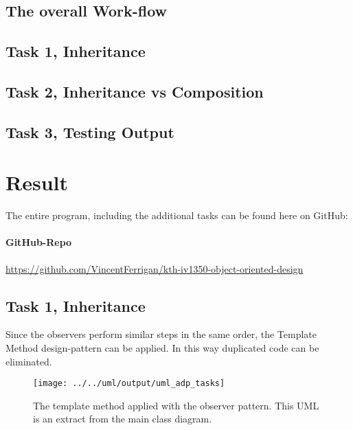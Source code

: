 \documentclass[a4paper]{scrreprt}
\begin{document}
\section*{The overall Work-flow}
\section*{Task 1, Inheritance}
\section*{Task 2, Inheritance vs Composition}
\section*{Task 3, Testing Output}

\newpage
\chapter{Result}
\label{sec:result}
The entire program, including the additional tasks can be found here on GitHub:

\subsubsection*{GitHub-Repo}
\url{https://github.com/VincentFerrigan/kth-iv1350-object-oriented-design}

\section*{Task 1, Inheritance}
Since the observers perform similar steps in the same order,
the Template Method design-pattern can be applied.
In this way duplicated code can be eliminated.

\begin{figure}[H]
    \begin{center}
        \texttt{[image: ../../uml/output/uml\_adp\_tasks]}
        \caption{The template method applied with the observer pattern.
        This UML is an extract from the main class diagram.\\}
        \label{fig:the-observers}
    \end{center}
\end{figure}
\end{document}
